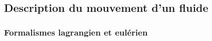 

%
%
%  
%
%




\subsection{Description du mouvement d'un fluide}

\subsubsection{Formalismes lagrangien et eulérien}


